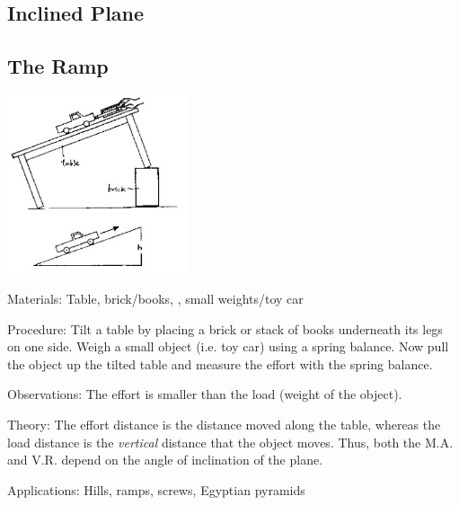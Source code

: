 \begin{multicols}{2}
\section*{Inclined Plane} 


\subsection{The Ramp}

\begin{center}
\includegraphics[width=0.4\textwidth]{./img/source/inclined-plane-2.jpg}
\end{center}

\begin{description*}
\item[Materials:]{Table, brick/books, , small weights/toy car}
\item[Procedure:]{Tilt a table by placing a brick or stack of books underneath its legs on one side. Weigh a small object (i.e. toy car) using a spring balance. Now pull the object up the tilted table and measure the effort with the spring balance.}
\item[Observations:]{The effort is smaller than the load (weight of the object).}
\item[Theory:]{The effort distance is the distance moved along the table, whereas the load distance is the \emph{vertical} distance that the object moves. Thus, both the M.A. and V.R. depend on the angle of inclination of the plane.}
\item[Applications:]{Hills, ramps, screws, Egyptian pyramids}
\end{description*}



\end{multicols}
